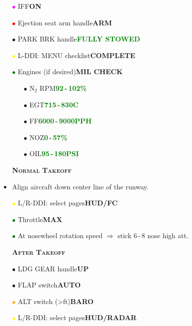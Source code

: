 \documentclass[a4paper,12pt,dvipsnames]{letter}
\newcommand{\button}[1]{\textbf{#1}}
\newcommand{\degC}{\textdegree{}C}
\newcommand{\Deg}{\textdegree{}}
\newcommand{\ok}[1]{\textcolor{Green}{\textbf{#1}}}
\newcommand{\myHead}[1]{{\LARGE\textsc{\textbf{#1}}}}
\newcommand{\bi}{\textcolor{ProcessBlue}{$\bullet$\;}}
\newcommand{\ri}{\textcolor{Red}{$\bullet$\;}}
\newcommand{\gi}{\textcolor{Green}{$\bullet$\;}}
\newcommand{\yi}{\textcolor{Yellow}{$\bullet$\;}}
\newcommand{\mi}{\textcolor{Magenta}{$\bullet$\;}}
\newcommand{\oi}{\textcolor{Orange}{$\bullet$\;}}
\begin{document}
{\begin{itemize}
 \item[\mi] IFF\dotfill\button{ON}
 \item[\ri] Ejection seat arm handle\dotfill\button{ARM}
 \item[\bi] PARK BRK handle\dotfill\ok{FULLY STOWED}
 \item[\yi] L-DDI: MENU checklist\dotfill\button{COMPLETE}
 \item[\gi] Engines (if desired)\dotfill\button{MIL CHECK}
 \begin{itemize}
  \item[\bi] N$_2$ RPM\dotfill\ok{92\,-\,102\%}
  \item[\bi] EGT\dotfill\ok{715\,-\,830\degC}
  \item[\bi] FF\dotfill\ok{6000\,-\,9000\;PPH}
  \item[\bi] NOZ\dotfill\ok{0\,-\,57\%}
  \item[\bi] OIL\dotfill\ok{95\,-\,180\;PSI}
 \end{itemize}
\end{itemize} 
\vspace{0.5em}
\begin{itemize}
 \item[] \myHead{Normal Takeoff}
 \item Align aircraft down center line of the runway.
 \item[\yi] L/R-DDI: select pages\dotfill\button{HUD/FC} 
 \item[\gi] Throttle\dotfill\button{MAX}
 \item[\gi] At nosewheel rotation speed $\Rightarrow$ stick 6\,-\,8\Deg{} nose high att.
\end{itemize}
\newpage
\begin{itemize}
 \item[] \myHead{After Takeoff}
 \item[\bi] LDG GEAR handle\dotfill\button{UP}
 \item[\bi] FLAP switch\dotfill\button{AUTO}
 \item[\oi] ALT switch (>\;ft)\dotfill\button{BARO}
 \item[\yi] L/R-DDI: select pages\dotfill\button{HUD/RADAR}
\end{itemize}
}
\end{document}
